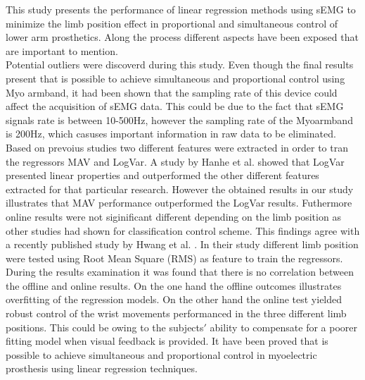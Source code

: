 This study presents the performance of linear regression methods using sEMG to minimize the limb position effect in proportional and simultaneous control of lower arm prosthetics. Along the process different aspects have been exposed that are important to mention.\\
Potential outliers were discoverd during this study. Even though the final results present that is possible to achieve simultaneous and proportional control using Myo armband, it had been shown that the sampling rate of this device could affect the acquisition of sEMG data. This could be due to the fact that sEMG signals  rate is between 10-500Hz, however the sampling rate of the Myoarmband is 200Hz, which casuses important information in raw data to be eliminated.
Based on prevoius studies two different features were extracted in order to tran the regressors MAV and LogVar.
A study by Hanhe \cite{hanhe2014} et al. showed that LogVar presented linear properties and outperformed the other different features extracted for that particular research. However the obtained results in our study illustrates that MAV performance outperformed the LogVar results. 
Futhermore online results were not siginificant different depending on the limb position as other studies had shown for classification control scheme. This findings agree with a recently published study by Hwang et al. \cite{Hwang2017}. In their study different limb position were tested using Root Mean Square (RMS) as feature to train the regressors.
During the results examination it was found that there is no correlation between the offline and online results. On the one hand the offline outcomes illustrates overfitting of the regression models. On the other hand the online test yielded robust control of the wrist movements performanced in the three different limb positions. This could be owing to the subjects$'$ ability to compensate for a poorer fitting model when visual feedback is provided.
It have been proved that is possible to achieve simultaneous and proportional control in myoelectric prosthesis using linear regression techniques. 
